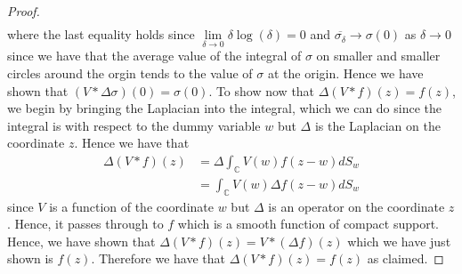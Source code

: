 \documentclass[11pt]{report}
\theoremstyle{definition}
\begin{document}
\begin{proof}
\begin{align*}
  \end{align*}
  where the last equality holds since $\lim\limits_{\delta \rightarrow 0}\delta \log(\delta) = 0$ and $\overline{\sigma_{\delta}} \rightarrow \sigma(0)$ as $\delta \rightarrow 0$ since we have that the average value of the integral of $\sigma$ on smaller and smaller circles around the orgin tends to the value of $\sigma$ at the origin.
  Hence we have shown that $(V * \Delta \sigma)(0) = \sigma(0)$. \newline
  To show now that $\Delta(V*f)(z) = f(z)$, we begin by bringing the Laplacian into the integral, which we can do since the integral is with respect to the dummy variable $w$ but $\Delta$ is the Laplacian on the coordinate $z$. Hence we have that
  \begin{align*}
    \Delta(V*f)(z) &= \Delta \int_\mathbb{C} V(w)f(z-w)dS_w \\
    &= \int_\mathbb{C} V(w)\Delta f(z-w)dS_w
  \end{align*}
 since $V$ is a function of the coordinate $w$ but $\Delta$ is an operator on the coordinate $z$. Hence, it passes through to $f$ which is a smooth function of compact support. Hence, we have shown that $\Delta(V*f)(z) = V*(\Delta f)(z)$ which we have just shown is $f(z)$. Therefore we have that $\Delta(V*f)(z) = f(z)$ as claimed.
\end{proof} 
\end{document}
